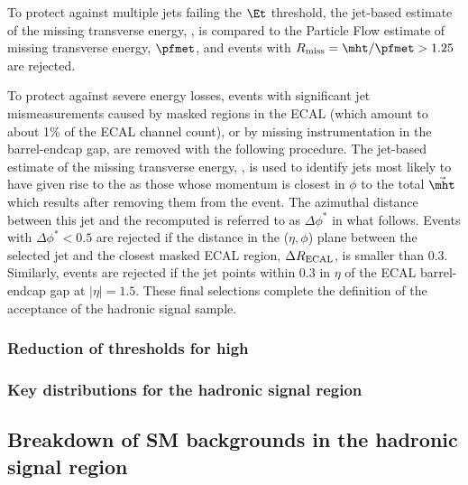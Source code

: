 To protect against multiple jets failing the $\Et$ threshold, the
jet-based estimate of the missing transverse energy, \mht, is compared
to the Particle Flow estimate of missing transverse energy, $\pfmet$,
and events with $R_{\rm miss}=\mht/\pfmet > 1.25$ are rejected.

To protect against severe energy losses, events with significant jet
mismeasurements caused by masked regions in the ECAL (which amount to
about 1\% of the ECAL channel count), or by missing instrumentation in
the barrel-endcap gap, are removed with the following procedure. The
jet-based estimate of the missing transverse energy, \mht, is used to
identify jets most likely to have given rise to the \mht as those
whose momentum is closest in $\phi$ to the total $\vec{\mht}$ which
results after removing them from the event.  The azimuthal distance
between this jet and the recomputed \mht is referred to as
$\Delta\phi^*$ in what follows. Events with $\Delta\phi^* < 0.5$ are
rejected if the distance in the ($\eta,\phi$) plane between the
selected jet and the closest masked ECAL region, $\Delta R_{\rm
  ECAL}$, is smaller than 0.3. Similarly, events are rejected if the
jet points within 0.3 in $\eta$ of the ECAL barrel-endcap gap at
$|\eta| = 1.5$. These final selections complete the definition of the
acceptance of the hadronic signal sample.


\subsubsection{Reduction of \alphat thresholds for high \HT}


\subsubsection{Key distributions for the hadronic signal
  region\label{sec:mc-data-comp}}

\subsection{Breakdown of SM backgrounds in the hadronic signal
  region\label{sec:bkgd-comp}}


